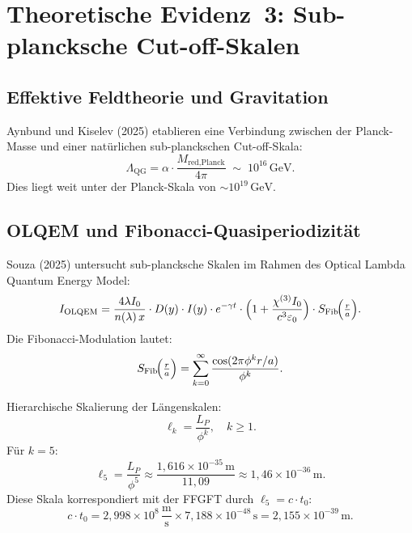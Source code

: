 \section{Theoretische Evidenz~3: Sub-plancksche Cut-off-Skalen}

\subsection{Effektive Feldtheorie und Gravitation}

Aynbund und Kiselev (2025) \cite{Aynbund2025} etablieren eine Verbindung
zwischen der Planck-Masse und einer natürlichen sub-planckschen Cut-off-Skala:
\begin{equation}
  \Lambda_{\text{QG}} = \alpha \cdot \frac{M_{\text{red,Planck}}}{4\pi}
  \;\sim\; 10^{16}\,\text{GeV}.
\end{equation}
Dies liegt weit unter der Planck-Skala von $\sim 10^{19}\,\text{GeV}$.

\subsection{OLQEM und Fibonacci-Quasiperiodizität}

Souza (2025) \cite{subPlanck2025} untersucht sub-plancksche Skalen im
Rahmen des Optical Lambda Quantum Energy Model:
\begin{equation}
  I_{\text{OLQEM}}
  = \frac{4\lambda I_0}{n(\lambda)\,x} \cdot D(y) \cdot I(y)
    \cdot e^{-\gamma t}
    \cdot \Bigl(1+\frac{\chi^{(3)}I_0}{c^3\varepsilon_0}\Bigr)
    \cdot S_{\text{Fib}}\!\Bigl(\tfrac{r}{a}\Bigr).
\end{equation}
Die Fibonacci-Modulation lautet:
\begin{equation}
  S_{\text{Fib}}\!\Bigl(\tfrac{r}{a}\Bigr)
  = \sum_{k=0}^{\infty} \frac{\cos(2\pi\phi^k r/a)}{\phi^k}.
\end{equation}

Hierarchische Skalierung der Längenskalen:
\begin{equation}
  \ell_k = \frac{L_P}{\phi^k},\quad k \ge 1.
\end{equation}
Für $k=5$:
\begin{equation}
  \ell_5 = \frac{L_P}{\phi^5}
         \approx \frac{1{,}616 \times 10^{-35}\,\text{m}}{11{,}09}
         \approx 1{,}46 \times 10^{-36}\,\text{m}.
\end{equation}
Diese Skala korrespondiert mit der FFGFT durch $\ell_5 = c\cdot t_0$:
\begin{equation}
  c \cdot t_0
  = 2{,}998 \times 10^8\,\frac{\text{m}}{\text{s}}
    \times 7{,}188 \times 10^{-48}\,\text{s}
  = 2{,}155 \times 10^{-39}\,\text{m}.
\end{equation}

